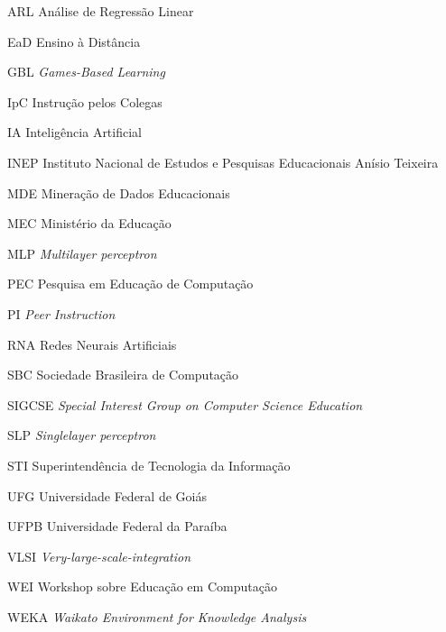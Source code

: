 \documentclass[
	12pt,				%
	oneside,
	a4paper,			%
    sumario=tradicional,%
	chapter=TITLE,		%
	english,			%
	french,				%
	spanish,			%
	brazil,				%
	]{abntex2}
\begin{document}
\listoffigures*
\cleardoublepage

\listoftables*
\cleardoublepage

\begin{siglas}

  \item[ARL] Análise de Regressão Linear
  \item[EaD] Ensino à Distância
  \item[GBL] \textit{Games-Based Learning}
  \item[IpC] Instrução pelos Colegas
  \item[IA] Inteligência Artificial
  \item[INEP] Instituto Nacional de Estudos e Pesquisas Educacionais Anísio Teixeira
  \item[MDE] Mineração de Dados Educacionais
  \item[MEC] Ministério da Educação
  \item[MLP] \textit{Multilayer perceptron}
  \item[PEC] Pesquisa em Educação de Computação
  \item[PI] \textit{Peer Instruction}
  \item[RNA] Redes Neurais Artificiais
  \item[SBC]	Sociedade Brasileira de Computação
  \item[SIGCSE] \textit{Special Interest Group on Computer Science Education}
  \item[SLP] \textit{Singlelayer perceptron}
  \item[STI] Superintendência de Tecnologia da Informação
  \item[UFG] Universidade Federal de Goiás
  \item[UFPB] Universidade Federal da Paraíba
  \item[VLSI] \textit{Very-large-scale-integration}
  \item[WEI] Workshop sobre Educação em Computação
  \item[WEKA] \textit{Waikato Environment for Knowledge Analysis}



\end{siglas}

\end{document}
